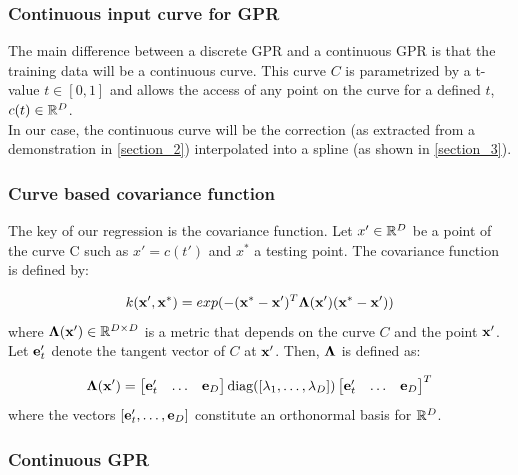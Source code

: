 \subsubsection{Continuous input curve for GPR}

The main difference between a discrete GPR and a continuous GPR is that the training data will be a continuous curve. This curve $C$ is parametrized by a t-value $t\in [0,1]$ and allows the access of any point on the curve for a defined $t$, $c(t) \in \mathbb{R}^D$.\\
In our case, the continuous curve will be the correction (as extracted from a demonstration in \autoref{section_2}) interpolated into a spline (as shown in \autoref{section_3}).

\subsubsection{Curve based covariance function}

The key of our regression is the covariance function. Let $x' \in \mathbb{R}^D$ be a point of the curve C such as $x'=c(t')$ and $x^*$ a testing point. The covariance function is defined by:

\begin{equation}
  \label{equ_covardef}
  k(\boldsymbol{\mathbf{x}}', \boldsymbol{\mathbf{x}}^*) = exp(-(\boldsymbol{\mathbf{x}}^* - \boldsymbol{\mathbf{x}}')^T\boldsymbol{\mathbf{{\Lambda}}}(\boldsymbol{\mathbf{x}}') (\boldsymbol{\mathbf{x}}^* - \boldsymbol{\mathbf{x}}'))
\end{equation}
where $\boldsymbol{\mathbf{{\Lambda}}}(\boldsymbol{\mathbf{x}}') \in \mathbb{R}^{D \times D}$ is a metric that depends on the curve $C$ and the point $\boldsymbol{\mathbf{x}}'$. Let $\boldsymbol{\mathbf{e}}_t'$ denote the tangent vector of $C$ at $\boldsymbol{\mathbf{x}}'$. Then, $\boldsymbol{\mathbf{{\Lambda}}}$ is defined as:

\begin{equation}
  \label{equ_lambdadefinition}
  \boldsymbol{\mathbf{{\Lambda}}}(\boldsymbol{\mathbf{x}}') =
  \begin{bmatrix}
    \boldsymbol{\mathbf{e}}_t' & \hdots & \boldsymbol{\mathbf{e}}_D
  \end{bmatrix}
  \text{diag}([\lambda_1,\hdots, \lambda_D])
  \begin{bmatrix}
    \boldsymbol{\mathbf{e}}_t' & \hdots & \boldsymbol{\mathbf{e}}_D
  \end{bmatrix}^T
\end{equation}
where the vectors $[\boldsymbol{\mathbf{e}}_t', \hdots, \boldsymbol{\mathbf{e}}_D]$ constitute an orthonormal basis for $\mathbb{R}^D$.

\subsubsection{Continuous GPR}

